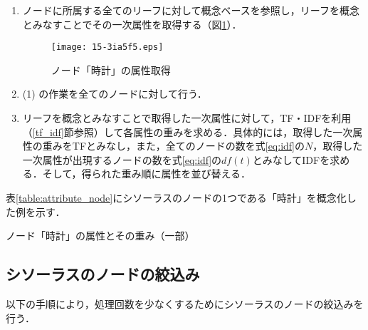 \documentclass[japanese]{jnlp_1.4}
\begin{document}
\begin{enumerate}
\item ノードに所属する全てのリーフに対して概念ベースを参照し，リーフを概念とみなすことでその一次属性を取得する（図\ref{fig:acquiring_attribute_of_node}）．

\begin{figure}[t]
\begin{center}
\texttt{[image: 15-3ia5f5.eps]}
\end{center}
\caption{ノード「時計」の属性取得}
\label{fig:acquiring_attribute_of_node}
\end{figure}

\item (1) の作業を全てのノードに対して行う．

\item リーフを概念とみなすことで取得した一次属性に対して，TF・IDFを利用（\ref{tf_idf}節参照）して各属性の重みを求める．具体的には，取得した一次属性の重みをTFとみなし，また，全てのノードの数を式\ref{eq:idf}の$N$，取得した一次属性が出現するノードの数を式\ref{eq:idf}の$\mathit{df}(t)$とみなしてIDFを求める．そして，得られた重み順に属性を並び替える．
\end{enumerate}

表\ref{table:attribute_node}にシソーラスのノードの1つである「時計」を概念化した例を示す．

\begin{table}[t]
\caption{ノード「時計」の属性とその重み（一部）}

\label{table:attribute_node}
\end{table}

\subsection{シソーラスのノードの絞込み}\label{narrowing_node}

以下の手順により，処理回数を少なくするためにシソーラスのノードの絞込みを行う．
\end{document}
